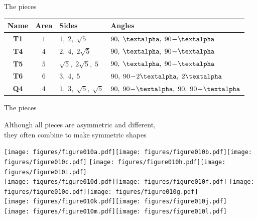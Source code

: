 \documentclass[14pt]{beamer}
\begin{document}
\begin{frame}{The pieces}
\begin{center}
            {\footnotesize
            \begin{tabular}{c|c|l|l}
                \;\;\textbf{Name}\;\; & \;\;\textbf{Area}\;\; & \;\;\textbf{Sides}          & \;\;\textbf{Angles} \\ \hline
                \textbf{T1}   & $1$           & \;\;$1,\; 2,\; \sqrt{5}$          & \;\;$90,\; \text{\textalpha},\; 90\!-\!\text{\textalpha}$   \\ \hline
                \textbf{T4}   & $4$           & \;\;$2,\; 4,\; 2\sqrt{5}$         & \;\;$90,\; \text{\textalpha},\; 90\!-\!\text{\textalpha}$   \\ \hline
                \textbf{T5}   & $5$           & \;\;$\sqrt{5},\; 2\sqrt{5},\; 5$  & \;\;$90,\; \text{\textalpha},\; 90\!-\!\text{\textalpha}$   \\ \hline
                \textbf{T6}   & $6$           & \;\;$3,\; 4,\; 5$                 & \;\;$90,\; 90\!-\!2\text{\textalpha},\; 2\text{\textalpha}$ \\ \hline
                \textbf{Q4}   & $4$           & \;\;$1,\; 3,\; \sqrt{5},\; \sqrt{5}$\;\; & \;\;$90,\; 90\!-\!\text{\textalpha},\; 90,\; 90\!+\!\text{\textalpha}$\;\;
            \end{tabular}}
        \end{center}
    \end{frame}


    \begin{frame}{The pieces}
        \begin{center}
            Although all pieces are asymmetric and different,\\they often combine to make symmetric shapes

            \bigskip \bigskip

            \texttt{[image: figures/figure010a.pdf]}\quad\texttt{[image: figures/figure010b.pdf]}\quad\texttt{[image: figures/figure010c.pdf]}\qquad
            \texttt{[image: figures/figure010h.pdf]}\quad\texttt{[image: figures/figure010i.pdf]} \\ \bigskip
            \texttt{[image: figures/figure010d.pdf]}\quad\texttt{[image: figures/figure010f.pdf]} \quad 
            \texttt{[image: figures/figure010e.pdf]}\quad\texttt{[image: figures/figure010g.pdf]} \\ \bigskip
            \texttt{[image: figures/figure010k.pdf]}\quad\texttt{[image: figures/figure010j.pdf]} \\ \medskip
            \texttt{[image: figures/figure010m.pdf]}\quad\texttt{[image: figures/figure010l.pdf]} \\
        \end{center}
    \end{frame}
\end{document}
